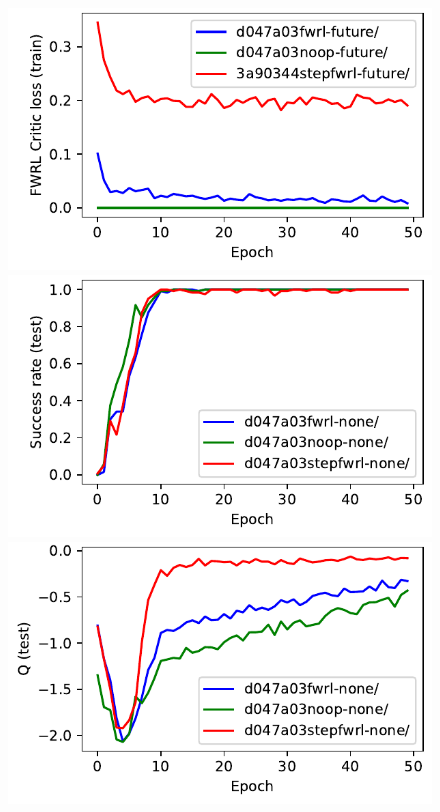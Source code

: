 \begin{figure}
  \includegraphics[width=\frac\columnwidth]{media/res/3a90344-FetchReach-v1-stepfwrl-future/train/critic_addnl_loss.pdf}\\
  \includegraphics[width=\frac\columnwidth]{media/res/d047a03-FetchReach-v1-stepfwrl-none/test/success_rate.pdf}%
  \includegraphics[width=\frac\columnwidth]{media/res/d047a03-FetchReach-v1-stepfwrl-none/test/mean_Q.pdf}%

\end{figure}
